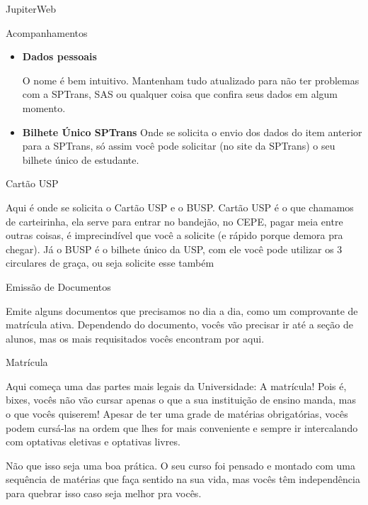 \begin{secao}{JupiterWeb}
\begin{subsecao}{Acompanhamentos}
\begin{itemize}
  \item \textbf{Dados pessoais}

    O nome é bem intuitivo. Mantenham tudo atualizado para não ter problemas com
    a SPTrans, SAS ou qualquer coisa que confira seus dados em algum momento.

  \item \textbf{Bilhete Único SPTrans}
    Onde se solicita o envio dos dados do item anterior para a SPTrans, só assim você pode solicitar (no site da SPTrans) o seu bilhete único de estudante.

\end{itemize}

\end{subsecao}

\begin{subsecao}{Cartão USP}

Aqui é onde se solicita o Cartão USP e o BUSP. Cartão USP é o que chamamos de carteirinha, ela serve para entrar no bandejão, no CEPE, pagar meia entre outras coisas, é imprecindível que você a solicite (e rápido porque demora pra chegar). Já o BUSP é o bilhete único da USP, com ele você pode utilizar os 3 circulares de graça, ou seja solicite esse também 

\end{subsecao}

\begin{subsecao}{Emissão de Documentos}

Emite alguns documentos que precisamos no dia a dia, como um comprovante de
matrícula ativa. Dependendo do documento, vocês vão precisar ir até a seção de
alunos, mas os mais requisitados vocês encontram por aqui.

\end{subsecao}

\begin{subsecao}{Matrícula}

Aqui começa uma das partes mais legais da Universidade: A matrícula! Pois é,
bixes, vocês não vão cursar apenas o que a sua instituição de ensino manda, mas o
que vocês quiserem! Apesar de ter uma grade de matérias obrigatórias, vocês
podem cursá-las na ordem que lhes for mais conveniente e sempre ir intercalando
com optativas eletivas e optativas livres.

Não que isso seja uma boa prática. O seu curso foi pensado e montado com uma
sequência de matérias que faça sentido na sua vida, mas vocês têm independência
para quebrar isso caso seja melhor pra vocês.


\end{subsecao}
\end{secao}
